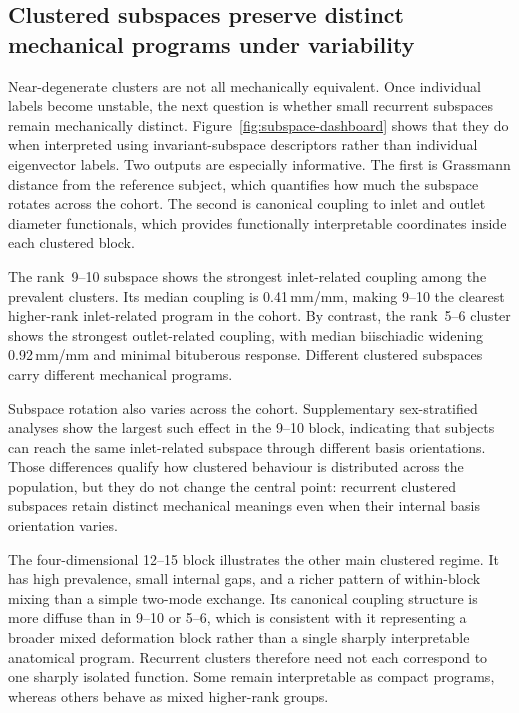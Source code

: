 \documentclass[11pt]{article}
\newcommand{\StdTableFont}{\footnotesize}
\newcommand{\StdTableInput}[1]{%
  \begingroup
  \setlength{\tabcolsep}{4pt}%
  \resizebox{\linewidth}{!}{}%
  \endgroup
}
\begin{document}
\begin{table}[!ht]
\centering
\caption{\textbf{Recurrent clustered rank blocks detected above the 3\% prevalence floor.}}
\label{tab:clusters}
\StdTableFont
\StdTableInput{../../analysis_outputs/tables/clusters.tex}
\end{table}

\subsection{Clustered subspaces preserve distinct mechanical programs under variability}
\label{sec:subspace-results}

Near-degenerate clusters are not all mechanically equivalent.
Once individual labels become unstable, the next question is whether small recurrent subspaces remain mechanically distinct.
Figure~\ref{fig:subspace-dashboard} shows that they do when interpreted using invariant-subspace descriptors rather than individual eigenvector labels.
Two outputs are especially informative.
The first is Grassmann distance from the reference subject, which quantifies how much the subspace rotates across the cohort.
The second is canonical coupling to inlet and outlet diameter functionals, which provides functionally interpretable coordinates inside each clustered block.

The rank~9--10 subspace shows the strongest inlet-related coupling among the prevalent clusters.
Its median coupling is 0.41\,mm/mm, making 9--10 the clearest higher-rank inlet-related program in the cohort.
By contrast, the rank~5--6 cluster shows the strongest outlet-related coupling, with median biischiadic widening 0.92\,mm/mm and minimal bituberous response.
Different clustered subspaces carry different mechanical programs.

Subspace rotation also varies across the cohort.
Supplementary sex-stratified analyses show the largest such effect in the 9--10 block, indicating that subjects can reach the same inlet-related subspace through different basis orientations.
Those differences qualify how clustered behaviour is distributed across the population, but they do not change the central point: recurrent clustered subspaces retain distinct mechanical meanings even when their internal basis orientation varies.

The four-dimensional 12--15 block illustrates the other main clustered regime.
It has high prevalence, small internal gaps, and a richer pattern of within-block mixing than a simple two-mode exchange.
Its canonical coupling structure is more diffuse than in 9--10 or 5--6, which is consistent with it representing a broader mixed deformation block rather than a single sharply interpretable anatomical program.
Recurrent clusters therefore need not each correspond to one sharply isolated function.
Some remain interpretable as compact programs, whereas others behave as mixed higher-rank groups.
\end{document}
